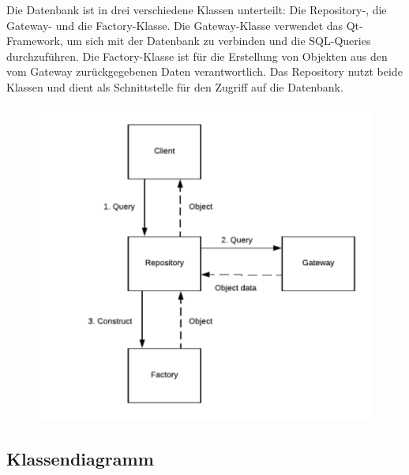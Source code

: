 \documentclass[a4paper,12pt]{article}
\begin{document}
\clearpage
Die Datenbank ist in drei verschiedene Klassen unterteilt: Die Repository-, die Gateway- und die Factory-Klasse. Die Gateway-Klasse verwendet das Qt-Framework, um sich mit der Datenbank zu verbinden und die SQL-Queries durchzuführen. Die Factory-Klasse ist für die Erstellung von Objekten aus den vom Gateway zurückgegebenen Daten verantwortlich. Das Repository nutzt beide Klassen und dient als Schnittstelle für den Zugriff auf die Datenbank.\newline


\begin{figure}
\includegraphics[width=\textwidth]{high_lvl_repository}
\end{figure}

\clearpage
\subsection{Klassendiagramm}

\end{document}

